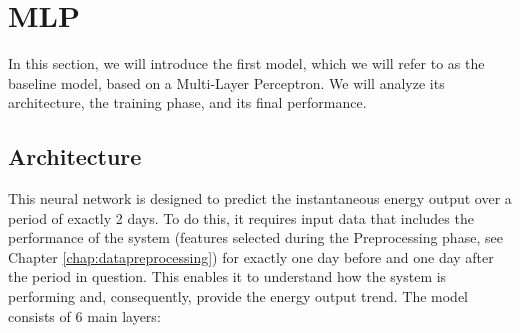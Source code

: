 \section{MLP}\label{sec:mlpbaseline}
In this section, we will introduce the first model, which we will refer to as the
baseline model, based on a Multi-Layer Perceptron.
We will analyze its architecture, the training phase, and its final performance.


\subsection{Architecture}
This neural network is designed to predict the instantaneous energy output over
a period of exactly 2 days.
To do this, it requires input data that includes the performance of the system
(features selected during the Preprocessing phase, see Chapter \ref{chap:datapreprocessing}) for exactly one day
before and one day after the period in question.
This enables it to understand how the system is performing and,
consequently, provide the energy output trend.
The model consists of 6 main layers:



